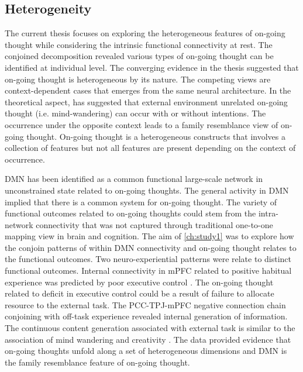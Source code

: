 \subsection{Heterogeneity}
The current thesis focuses on exploring the heterogeneous features of on-going thought while considering the intrinsic functional connectivity at rest. The conjoined decomposition revealed various types of on-going thought can be identified at individual level. The converging evidence in the thesis suggested that on-going thought is heterogeneous by its nature. The competing views are context-dependent cases that emerges from the same neural architecture. In the theoretical aspect,  has suggested that external environment unrelated on-going thought (i.e. mind-wandering) can occur with or without intentions. The occurrence under the opposite context leads to a family resemblance view of on-going thought. On-going thought is a heterogeneous constructs that involves a collection of features but not all features are present depending on the context of occurrence. 

DMN has been identified as a common functional large-scale network in unconstrained state related to on-going thoughts. The general activity in DMN implied that there is a common system for on-going thought. The variety of functional outcomes related to on-going thoughts could stem from the intra-network connectivity that was not captured through traditional one-to-one mapping view in brain and cognition. The aim of \cref{ch:study1} was to explore how the conjoin patterns of within DMN connectivity and on-going thought relates to the functional outcomes. Two neuro-experiential patterns were relate to distinct functional outcomes. Internal connectivity in mPFC related to positive habitual experience was predicted by poor executive control \cite{McVay2009}. The on-going thought related to deficit in executive control could be a result of failure to allocate resource to the external task. The PCC-TPJ-mPFC negative connection chain conjoining with off-task experience revealed internal generation of information. The continuous content generation associated with external task is similar to the association of mind wandering and creativity \cite{Baird2012}. The data provided evidence that on-going thoughts unfold along a set of heterogeneous dimensions and DMN is the family resemblance feature of on-going thought.

